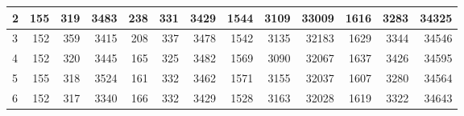 \begin{table}[bh]
{{\begin{tabular}{|l|r|r|r|r|r|r|r|r|r|r|r|r|}
		2                                                             & 155                              & 319                               & 3483                               & 238                              & 331                               & 3429                               & 1544                             & 3109                              & 33009                              & 1616                             & 3283                              & 34325                              \\ \hline
		3                                                             & 152                              & 359                               & 3415                               & 208                              & 337                               & 3478                               & 1542                             & 3135                              & 32183                              & 1629                             & 3344                              & 34546                              \\ \hline
		4                                                             & 152                              & 320                               & 3445                               & 165                              & 325                               & 3482                               & 1569                             & 3090                              & 32067                              & 1637                             & 3426                              & 34595                              \\ \hline
		5                                                             & 155                              & 318                               & 3524                               & 161                              & 332                               & 3462                               & 1571                             & 3155                              & 32037                              & 1607                             & 3280                              & 34564                              \\ \hline
		6                                                             & 152                              & 317                               & 3340                               & 166                              & 332                               & 3429                               & 1528                             & 3163                              & 32028                              & 1619                             & 3322                              & 34643                              \\ \hline

\end{tabular}}}
\end{table}
